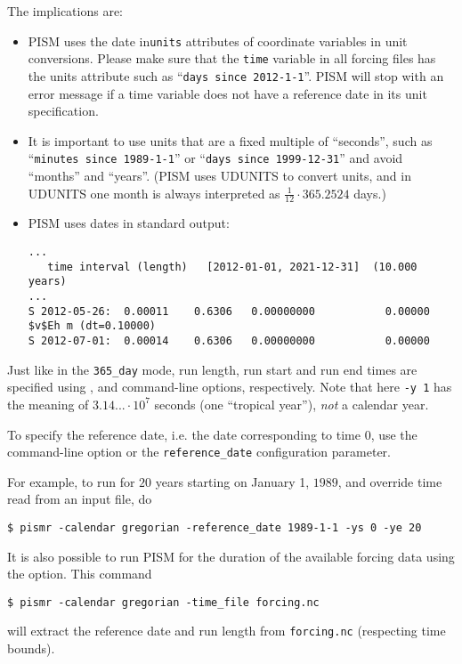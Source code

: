 \documentclass[titlepage,letterpaper,final]{scrartcl}
\def\variable#1{\texttt{#1}\index{NetCDF variables!\texttt{#1}}}
\begin{document}
The implications are:
\begin{itemize}
\item PISM uses the date in\texttt{units} attributes of coordinate variables in
  unit conversions. Please make sure that the \variable{time} variable in all
  forcing files has the units attribute such as ``\texttt{days since
    2012-1-1}''. PISM will stop with an error message if a time variable does
  not have a reference date in its unit specification.
\item It is important to use units that are a fixed multiple of ``seconds'',
  such as ``\texttt{minutes since 1989-1-1}'' or ``\texttt{days since
    1999-12-31}'' and avoid ``months'' and ``years''. (PISM uses UDUNITS to
  convert units, and in UDUNITS one month is always interpreted as
  $\frac{1}{12}\cdot 365.2524$ days.)
\item PISM uses dates in standard output:
\begin{verbatim}
...
   time interval (length)   [2012-01-01, 2021-12-31]  (10.000 years)
...
S 2012-05-26:  0.00011    0.6306   0.00000000           0.00000
$v$Eh m (dt=0.10000)
S 2012-07-01:  0.00014    0.6306   0.00000000           0.00000
\end{verbatim}
\end{itemize}

Just like in the \texttt{365_day} mode, run length, run start and run end times
are specified using ,  and 
command-line options, respectively. Note that here \texttt{-y 1} has the
meaning of $3.14...\cdot 10^{7}$ seconds (one ``tropical year''), \emph{not} a
calendar year.

To specify the reference date, i.e. the date corresponding to time $0$, use the
 command-line option or the
\texttt{reference_date} configuration parameter.

For example, to run for $20$ years starting on January 1, $1989$, and override time read from an input file, do
\begin{verbatim}
$ pismr -calendar gregorian -reference_date 1989-1-1 -ys 0 -ye 20
\end{verbatim} %

It is also possible to run PISM for the duration of the available forcing data using the  option.
This command
\begin{verbatim}
$ pismr -calendar gregorian -time_file forcing.nc
\end{verbatim} %
will extract the reference date and run length from \texttt{forcing.nc} (respecting time bounds).
\end{document}
